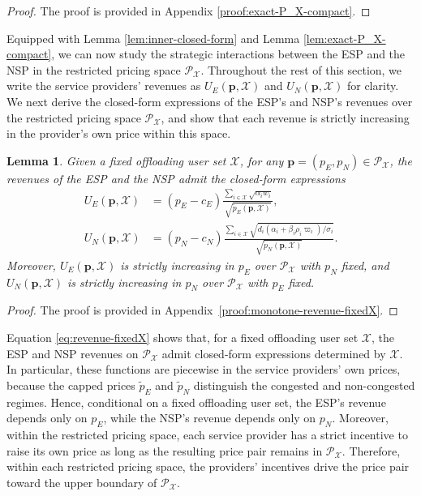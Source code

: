 \documentclass[lettersize,journal]{IEEEtran}
\newtheorem{lemma}{Lemma}
\begin{document}
\begin{proof}
    The proof is provided in Appendix \ref{proof:exact-P_X-compact}.
\end{proof}

Equipped with Lemma \ref{lem:inner-closed-form} and Lemma \ref{lem:exact-P_X-compact}, we can now study the strategic interactions between the ESP and the NSP in the restricted pricing space $\mathcal{P}_{\mathcal{X}}$.
Throughout the rest of this section, we write the service providers' revenues as
$U_E(\boldsymbol{p},\mathcal{X})$ and $U_N(\boldsymbol{p},\mathcal{X})$ for clarity.
We next derive the closed-form expressions of the ESP's and NSP's revenues over the restricted pricing space $\mathcal{P}_{\mathcal{X}}$, and show that each revenue is strictly increasing in the provider's own price within this space.

\begin{lemma}\label{lem:monotone-revenue-fixedX}
Given a fixed offloading user set $\mathcal{X}$, for any
$\boldsymbol{p}=(p_E,p_N)\in\mathcal{P}_{\mathcal{X}}$, the revenues of the ESP and the NSP admit the closed-form expressions
\begin{subequations}\label{eq:revenue-fixedX}
\begin{align}
U_E(\boldsymbol{p},\mathcal{X})
&=
(p_E-c_E)\frac{\sum_{i\in\mathcal{X}}\sqrt{\alpha_iw_i}}
{\sqrt{\tilde p_E(\boldsymbol{p},\mathcal{X})}},
\\
U_N(\boldsymbol{p},\mathcal{X})
&=
(p_N-c_N)\frac{\sum_{i\in\mathcal{X}}\sqrt{d_i(\alpha_i+\beta_i\rho_i\varpi_i)/\sigma_i}}
{\sqrt{\tilde p_N(\boldsymbol{p},\mathcal{X})}}.
\end{align}
\end{subequations}
Moreover, $U_E(\boldsymbol{p}, \mathcal{X})$ is strictly increasing in $p_E$ over $\mathcal{P}_{\mathcal{X}}$ with $p_N$ fixed, and
$U_N(\boldsymbol{p}, \mathcal{X})$ is strictly increasing in $p_N$ over $\mathcal{P}_{\mathcal{X}}$ with $p_E$ fixed.
\end{lemma}

\begin{proof}
The proof is provided in Appendix~\ref{proof:monotone-revenue-fixedX}.
\end{proof}

Equation \eqref{eq:revenue-fixedX} shows that, for a fixed offloading user set $\mathcal{X}$, the ESP and NSP revenues on $\mathcal{P}_{\mathcal{X}}$ admit closed-form expressions determined by $\mathcal{X}$. In particular, these functions are piecewise in the service providers' own prices, because the capped prices $\tilde{p}_E$ and $\tilde{p}_N$ distinguish the congested and non-congested regimes. Hence, conditional on a fixed offloading user set, the ESP's revenue depends only on $p_E$, while the NSP's revenue depends only on $p_N$. Moreover, within the restricted pricing space, each service provider has a strict incentive to raise its own price as long as the resulting price pair remains in $\mathcal{P}_{\mathcal{X}}$. Therefore, within each restricted pricing space, the providers' incentives drive the price pair toward the upper boundary of $\mathcal{P}_{\mathcal{X}}$.
\end{document}
